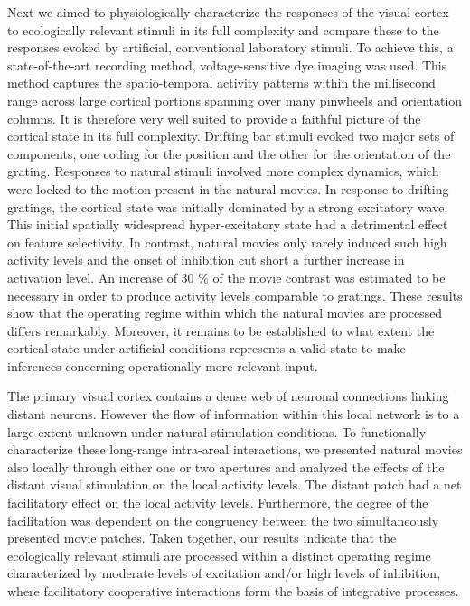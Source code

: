 Next we aimed to physiologically characterize the responses of the visual
cortex to ecologically relevant stimuli in its full complexity and compare
these to the responses evoked by artificial, conventional laboratory
stimuli. To achieve this, a state-of-the-art recording method,
voltage-sensitive dye imaging was used. This method captures the
spatio-temporal activity patterns within the millisecond range across large
cortical portions spanning over many pinwheels and orientation columns. It
is therefore very well suited to provide a faithful picture of the cortical
state in its full complexity. Drifting bar stimuli evoked two major sets of
components, one coding for the position and the other for the orientation of the
grating. Responses to natural stimuli involved more complex dynamics,
which were locked to the motion present in the natural movies. In response
to drifting gratings, the cortical state was initially dominated by a
strong excitatory wave. This initial spatially widespread hyper-excitatory
state had a detrimental effect on feature selectivity. In contrast, natural
movies only rarely induced such high activity levels and the onset of
inhibition cut short a further increase in activation level. An increase of
30 \% of the movie contrast was estimated to be necessary in order to
produce activity levels comparable to gratings. These results show that the
operating regime within which the natural movies are processed differs
remarkably. Moreover, it remains to be established to what extent the
cortical state under artificial conditions represents a valid state to make
inferences concerning operationally more relevant input.

The primary visual cortex contains a dense web of neuronal connections
linking distant neurons. However the flow of information within this local
network is to a large extent unknown under natural stimulation conditions.
To functionally characterize these long-range intra-areal interactions, we
presented natural movies also locally through either one or two apertures
and analyzed the effects of the distant visual stimulation on the local
activity levels. The distant patch had a net facilitatory effect on the
local activity levels. Furthermore, the degree of the facilitation was
dependent on the congruency between the two simultaneously presented movie
patches. Taken together, our results indicate that the ecologically
relevant stimuli are processed within a distinct operating regime
characterized by moderate levels of excitation and/or high levels of
inhibition, where facilitatory cooperative interactions form the basis of
integrative processes. 

